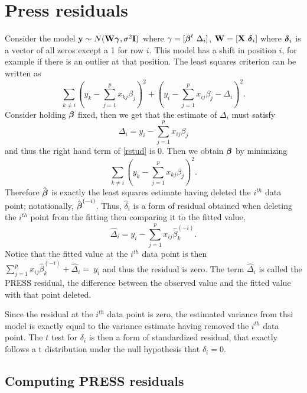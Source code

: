 \section{Press residuals}
\label{sec:press}

Consider the model $\mathbf{y} \sim N(\mathbf{W} \boldsymbol{\gamma}, \sigma^2 \mathbf{I})$
where $\gamma = [\boldsymbol{\beta}^t ~ \Delta_i]$, 
$\mathbf{W} = [\mathbf{X} ~ \boldsymbol{\delta}_i]$ where $\boldsymbol{\delta}_i$ is a vector of all zeros
except a 1 for row $i$. This model has a shift in position $i$, for 
example if there is an outlier at that position. 
The least squares criterion can be written as
\begin{equation}
\label{rstud}
\sum_{k\neq i} \left(y_k - \sum_{j = 1}^p x_{kj} \beta_j \right)^2
+ \left(y_i - \sum_{j=1}^p x_{ij} \beta_j - \Delta_i\right)^2.
\end{equation}
Consider holding $\boldsymbol{\beta}$ fixed, then we get that the estimate of
$\Delta_i$ must satisfy
$$
\Delta_i = y_i - \sum_{j=1}^p x_{ij} \beta_j
$$
and thus the right hand term of \eqref{rstud} is 0. Then we obtain $\boldsymbol{\beta}$ by minimizing
$$
\sum_{k\neq i} \left(y_k - \sum_{j = 1}^p x_{kj} \beta_j \right)^2.
$$
Therefore $\hat {\boldsymbol{\beta}}$ is exactly the least squares estimate having
deleted the $i^{th}$ data point; notationally, $\hat{\boldsymbol{\beta}}^{(-i)}$. Thus, $\hat \delta_i$ 
is a form of residual obtained when deleting
the $i^{th}$ point from the fitting then comparing it to the fitted value, 
$$
\hat \Delta_i = y_i - \sum_{j=1}^p x_{ij} \hat \beta^{(-i)}_{k}.
$$
Notice that the fitted value at the $i^{th}$ data point is then 
$\sum_{j=1}^p x_{ij} \hat \beta^{(-i)}_{k} + \hat \Delta_i = \ y_i$ and thus
the residual is zero. The term $\hat \Delta_i$ is called the PRESS residual, the
difference between the observed value and the fitted value with that point deleted.

Since the residual at the $i^{th}$ data point is zero, the estimated variance from
thsi model is exactly equal to the variance estimate having removed the
$i^{th}$ data point. The $t$ test for $\delta_i$ is then a form of 
standardized residual, that exactly follows a t distribution under the null
hypothesis that $\delta_i = 0$. 

\subsection{Computing PRESS residuals}

